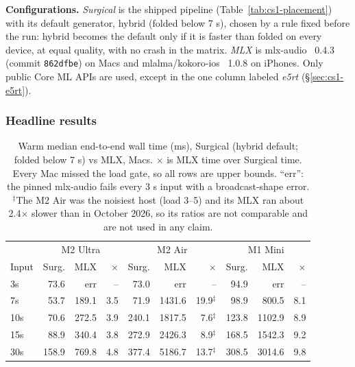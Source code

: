\documentclass[11pt]{article}
\newcommand{\code}[1]{\texttt{#1}}
\begin{document}
\textbf{Configurations.} \emph{Surgical} is the shipped pipeline (Table~\ref{tab:cs1-placement}) with its default generator, hybrid (folded below 7 s), chosen by a rule fixed before the run: hybrid becomes the default only if it is faster than folded on every device, at equal quality, with no crash in the matrix. \emph{MLX} is mlx-audio~\citep{mlx-audio} 0.4.3 (commit \code{862dfbe}) on Macs and mlalma/kokoro-ios~\citep{kokoro-ios} 1.0.8 on iPhones. Only public Core ML APIs are used, except in the one column labeled \emph{e5rt} (\S\ref{sec:cs1-e5rt}).

\subsubsection{Headline results}\label{sec:cs1-headline}

\begin{table}[h]
\centering
\small
\caption{Warm median end-to-end wall time (ms), Surgical (hybrid default; folded below 7 s) vs MLX, Macs. $\times$ is MLX time over Surgical time. Every Mac missed the load gate, so all rows are upper bounds. ``err'': the pinned mlx-audio fails every 3 s input with a broadcast-shape error. $^\ddagger$The M2 Air was the noisiest host (load 3--5) and its MLX ran about 2.4$\times$ slower than in October 2026, so its ratios are not comparable and are not used in any claim.}
\label{tab:cs1-mac}
\begin{tabular}{lrrrrrrrrr}
\toprule
 & \multicolumn{3}{c}{M2 Ultra} & \multicolumn{3}{c}{M2 Air} & \multicolumn{3}{c}{M1 Mini} \\
Input & Surg. & MLX & $\times$ & Surg. & MLX & $\times$ & Surg. & MLX & $\times$ \\
\midrule
3s  & 73.6 & err & -- & 73.0 & err & -- & 94.9 & err & -- \\
7s  & 53.7 & 189.1 & 3.5 & 71.9 & 1431.6 & 19.9$^\ddagger$ & 98.9 & 800.5 & 8.1 \\
10s & 70.6 & 272.5 & 3.9 & 240.1 & 1817.5 & 7.6$^\ddagger$ & 123.8 & 1102.9 & 8.9 \\
15s & 88.9 & 340.4 & 3.8 & 272.9 & 2426.3 & 8.9$^\ddagger$ & 168.5 & 1542.3 & 9.2 \\
30s & 158.9 & 769.8 & 4.8 & 377.4 & 5186.7 & 13.7$^\ddagger$ & 308.5 & 3014.6 & 9.8 \\
\bottomrule
\end{tabular}
\end{table}
\end{document}
